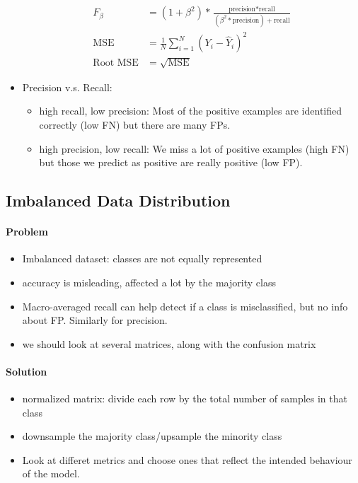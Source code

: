 \documentclass[twocolumn,landscape,10pt]{article}
\theoremstyle{definition}
\begin{document}
\begin{itemize}
\begin{align*}
            F_\beta&=(1+\beta^2)*\frac{\text{precision}*\text{recall}}{(\beta^2*\text{precision})+\text{recall}}\\
            \text{MSE}&=\frac{1}{N}\sum_{i=1}^{N}
            {\left(Y_i-\hat{Y}_i\right)}^{2}\\
            \text{Root MSE}&=\sqrt{\text{MSE}}
        \end{align*} 
    \item Precision v.s. Recall:
        \begin{itemize}
            \item high recall, low precision:
                Most of the positive examples are identified correctly (low FN)
                but there are many FPs.
            \item high precision, low recall:
                We miss a lot of positive examples (high FN) but those we
                predict as positive are really positive (low FP).
        \end{itemize} 
\end{itemize} 

\subsection{Imbalanced Data Distribution}

\paragraph{Problem}
\begin{itemize}
    \item Imbalanced dataset: classes are not equally represented
    \item accuracy is misleading, affected a lot by the majority class
    \item Macro-averaged recall can help detect if a class is misclassified, but
        no info about FP. Similarly for precision.
    \item we should look at several matrices, along with the confusion matrix
\end{itemize} 

\paragraph{Solution}
\begin{itemize}
    \item normalized matrix: divide each row by the total number of samples in
        that class
    \item downsample the majority class/upsample the minority class
    \item Look at differet metrics and choose ones that reflect the intended
        behaviour of the model.
\end{itemize} 
\end{document}
